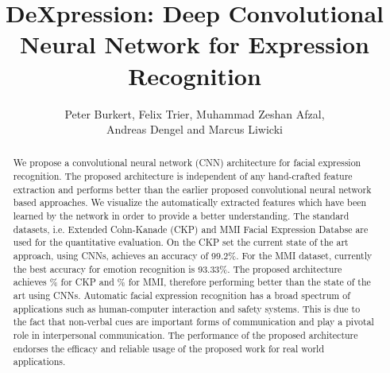 \documentclass[10pt,journal,compsoc, hidelinks]{IEEEtran}
\begin{document}
\title{DeXpression: Deep Convolutional Neural Network for Expression Recognition}






\author{

Peter Burkert,
Felix Trier,
Muhammad Zeshan Afzal,

Andreas Dengel and 
Marcus Liwicki




}


 
\maketitle



\begin{abstract}

We propose a convolutional neural network (CNN) architecture for facial expression recognition. The proposed architecture is independent of any hand-crafted feature extraction and performs better than the earlier proposed convolutional neural network based approaches. We visualize the automatically extracted features which have been learned by the network in order to provide a better understanding. The standard datasets, i.e. Extended Cohn-Kanade (CKP) and MMI Facial Expression Databse are used for the quantitative evaluation. On the CKP set the current state of the art approach, using CNNs, achieves an accuracy of 99.2\%. For the MMI dataset, currently the best accuracy for emotion recognition is 93.33\%. The proposed architecture achieves \% for CKP and \% for MMI, therefore performing better than the state of the art using CNNs. Automatic facial expression recognition has a broad spectrum of applications such as human-computer interaction and safety systems. This is due to the fact that non-verbal cues are important forms of communication and play a pivotal role in interpersonal communication. The performance of the proposed architecture endorses the efficacy and reliable usage of the proposed work for real world applications.

\end{abstract} 
\end{document}
